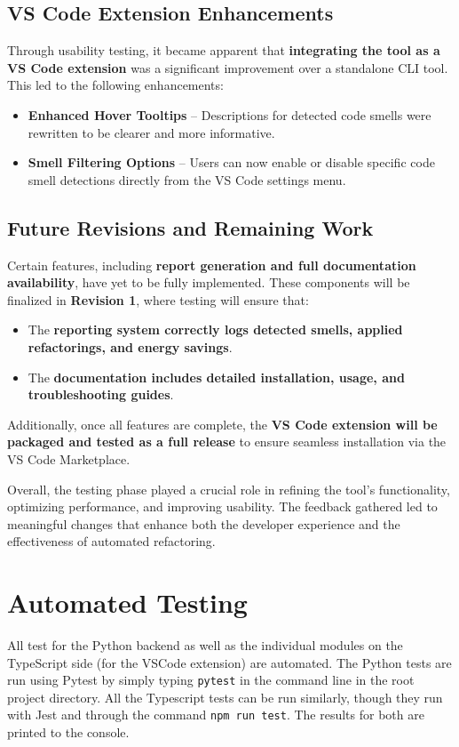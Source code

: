 \documentclass[12pt, titlepage]{article}
\begin{document}
\subsection{VS Code Extension Enhancements}
Through usability testing, it became apparent that
\textbf{integrating the tool as a VS Code extension} was a
significant improvement over a standalone CLI tool. This led to the
following enhancements:
\begin{itemize}
  \item \textbf{Enhanced Hover Tooltips} – Descriptions for detected
    code smells were rewritten to be clearer and more informative.
  \item \textbf{Smell Filtering Options} – Users can now enable or
    disable specific code smell detections directly from the VS Code
    settings menu.
\end{itemize}

\subsection{Future Revisions and Remaining Work}
Certain features, including \textbf{report generation and full
documentation availability}, have yet to be fully implemented. These
components will be finalized in \textbf{Revision 1}, where testing
will ensure that:
\begin{itemize}
  \item The \textbf{reporting system correctly logs detected smells,
    applied refactorings, and energy savings}.
  \item The \textbf{documentation includes detailed installation,
    usage, and troubleshooting guides}.
\end{itemize}

Additionally, once all features are complete, the \textbf{VS Code
extension will be packaged and tested as a full release} to ensure
seamless installation via the VS Code Marketplace.

\bigskip
Overall, the testing phase played a crucial role in refining the
tool’s functionality, optimizing performance, and improving
usability. The feedback gathered led to meaningful changes that
enhance both the developer experience and the effectiveness of
automated refactoring.

\section{Automated Testing}

All test for the Python backend as well as the individual modules on
the TypeScript side (for the VSCode extension) are automated. The
Python tests are run using Pytest by simply typing \texttt{pytest} in
the command line in the root project directory. All the Typescript
tests can be run similarly, though they run with Jest and through the
command \texttt{npm run test}. The results for both are printed to the console.
\end{document}
